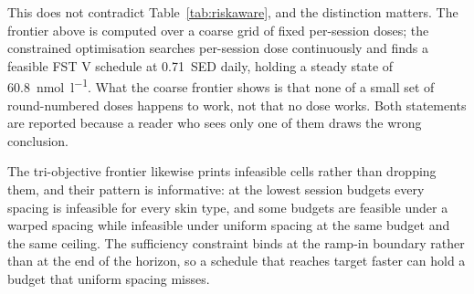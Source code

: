 \documentclass[11pt]{article}
\newcommand{\nmol}{\si{\nano\mole\per\litre}}
\newcommand{\SED}{SED}
\begin{document}
This does not contradict Table~\ref{tab:riskaware}, and the
distinction matters. The frontier above is computed over a coarse
grid of fixed per-session doses; the constrained optimisation searches
per-session dose continuously and finds a feasible FST V schedule at
\SI{0.71}{\SED} daily, holding a steady state of 60.8~\nmol{}. What
the coarse frontier shows is that none of a small set of round-numbered
doses happens to work, not that no dose works. Both statements are
reported because a reader who sees only one of them draws the wrong
conclusion.

The tri-objective frontier likewise prints infeasible cells rather
than dropping them, and their pattern is informative: at the lowest
session budgets every spacing is infeasible for every skin type, and
some budgets are feasible under a warped spacing while infeasible
under uniform spacing at the same budget and the same ceiling. The
sufficiency constraint binds at the ramp-in boundary rather than at
the end of the horizon, so a schedule that reaches target faster can
hold a budget that uniform spacing misses.
\end{document}
